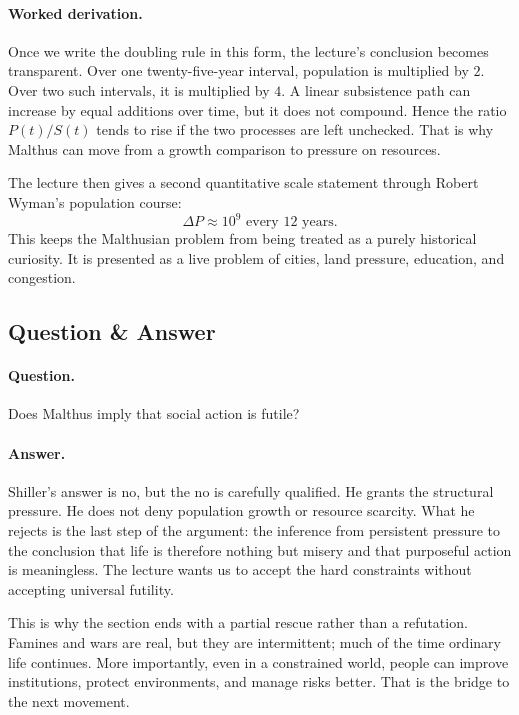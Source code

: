 \paragraph{Worked derivation.} Once we write the doubling rule in this form, the lecture's conclusion becomes transparent. Over one twenty-five-year interval, population is multiplied by \(2\). Over two such intervals, it is multiplied by \(4\). A linear subsistence path can increase by equal additions over time, but it does not compound. Hence the ratio \(P(t)/S(t)\) tends to rise if the two processes are left unchecked. That is why Malthus can move from a growth comparison to pressure on resources.

The lecture then gives a second quantitative scale statement through Robert Wyman's population course:
\begin{equation}
\Delta P \approx 10^9 \text{ every 12 years.}
\end{equation}
This keeps the Malthusian problem from being treated as a purely historical curiosity. It is presented as a live problem of cities, land pressure, education, and congestion.

\subsection{Question \& Answer}

\paragraph{Question.} Does Malthus imply that social action is futile?

\paragraph{Answer.} Shiller's answer is no, but the no is carefully qualified. He grants the structural pressure. He does not deny population growth or resource scarcity. What he rejects is the last step of the argument: the inference from persistent pressure to the conclusion that life is therefore nothing but misery and that purposeful action is meaningless. The lecture wants us to accept the hard constraints without accepting universal futility.

This is why the section ends with a partial rescue rather than a refutation. Famines and wars are real, but they are intermittent; much of the time ordinary life continues. More importantly, even in a constrained world, people can improve institutions, protect environments, and manage risks better. That is the bridge to the next movement.

